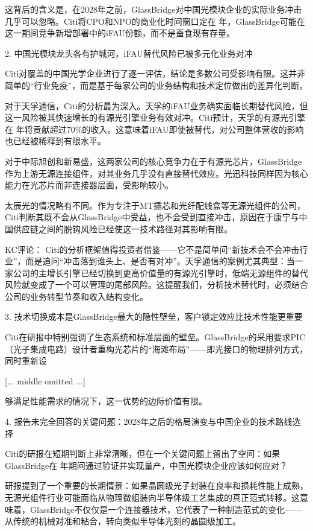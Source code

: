 \documentclass[11pt]{ctexart}
\begin{document}
这背后的含义是，在2028年之前，GlassBridge对中国光模块企业的实际业务冲击几乎可以忽略。Citi将CPO和NPO的商业化时间窗口定在 年，GlassBridge可能在这一期间竞争新增部署中的iFAU份额，而不是蚕食现有存量。

2. 中国光模块龙头各有护城河，iFAU替代风险已被多元化业务对冲

Citi对覆盖的中国光学企业进行了逐一评估，结论是多数公司受影响有限。这并非简单的“行业免疫”，而是基于每家公司的业务结构和技术定位做出的差异化判断。

对于天孚通信，Citi的分析最为深入。天孚的iFAU业务确实面临长期替代风险，但这一风险被其快速增长的有源光引擎业务有效对冲。Citi预计，天孚的有源光引擎在 年将贡献超过70\%的收入。这意味着iFAU即使被替代，对公司整体营收的影响也已经被稀释到有限水平。

对于中际旭创和新易盛，这两家公司的核心竞争力在于有源光芯片，GlassBridge作为上游无源连接组件，对其业务几乎没有直接替代效应。光迅科技同样因为核心能力在光芯片而非连接器层面，受影响较小。

太辰光的情况略有不同。作为专注于MT插芯和光纤配线盒等无源光组件的公司，Citi判断其既不会从GlassBridge中受益，也不会受到直接冲击，原因在于康宁与中国供应链之间的脱钩风险已经使这一技术路径对其影响有限。

KC评论： Citi的分析框架值得投资者借鉴——它不是简单问“新技术会不会冲击行业”，而是追问“冲击落到谁头上、是否有对冲”。天孚通信的案例尤其典型：当一家公司的主增长引擎已经切换到更高价值量的有源光引擎时，低端无源组件的替代风险就变成了一个可以管理的尾部风险。这提醒我们，分析技术替代时，必须结合公司的业务转型节奏和收入结构变化。

3. 技术切换成本是GlassBridge最大的隐性壁垒，客户锁定效应比技术性能更重要

Citi在研报中特别强调了生态系统和标准层面的壁垒。GlassBridge的采用要求PIC（光子集成电路）设计者重构光芯片的“海滩布局”——即光接口的物理排列方式，同时重新设

[... middle omitted ...]

够满足性能需求的情况下，这一优势的边际价值有限。

4. 报告未完全回答的关键问题：2028年之后的格局演变与中国企业的技术路线选择

Citi的研报在短期判断上非常清晰，但在一个关键问题上留出了空间：如果GlassBridge在 年期间通过验证并实现量产，中国光模块企业应该如何应对？

研报提到了一个重要的长期情景：如果晶圆级光子封装在良率和损耗性能上成熟，无源光组件行业可能面临从物理微组装向半导体级工艺集成的真正范式转移。这意味着，GlassBridge不仅仅是一个连接器技术，它代表了一种制造范式的变化——从传统的机械对准和粘合，转向类似半导体光刻的晶圆级加工。
\end{document}
